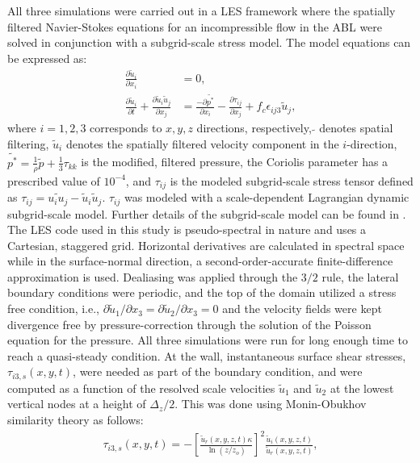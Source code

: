 All three simulations were carried out in a LES framework where the spatially filtered Navier-Stokes equations for an incompressible flow in the ABL were solved in conjunction with a subgrid-scale stress model. The model equations can be expressed as: 
\begin{align}
    \frac{\partial \tilde{u}_i}{\partial x_{i}} &= 0, \\
    \frac{\partial \tilde{u}_i}{\partial t}+ \frac{\partial \tilde{u}_i\tilde{u}_j}{\partial x_{j}}  &= \frac{-\partial \tilde{p^*}}{\partial x_i}-\frac{\partial \tau_{ij}}{\partial x_j}+ f_{c}\epsilon_{ij3}\tilde{u}_{j},   
\label{eqn:les_eqn}    
\end{align}
\noindent where $i={1,2,3}$ corresponds to $x,y,z$ directions, respectively, ${\tilde{}}$ denotes spatial filtering, $\tilde{u}_i$ denotes the spatially filtered velocity component in the $i$-direction, $\tilde{p^*}=\frac{1}{\rho} \tilde{p}+\frac{1}{3}\tau_{kk}$ is the modified, filtered pressure, the Coriolis parameter has a prescribed value of $10^{-4}$, and $\tau_{ij}$ is the modeled subgrid-scale stress tensor defined as $\tau_{ij}=\widetilde{u_i u_j}-\tilde{u}_i\tilde{u}_j$. $\tau_{ij}$ was modeled with a scale-dependent Lagrangian dynamic subgrid-scale model. Further details of the subgrid-scale model can be found in \citet{stoll_wrr_2006}. The LES code used in this study is pseudo-spectral in nature and uses a Cartesian, staggered grid. Horizontal derivatives are calculated in spectral space while in the surface-normal direction, a second-order-accurate finite-difference approximation is used. Dealiasing was applied through the $3/2$ rule, the lateral boundary conditions were periodic, and the top of the domain utilized a stress free condition, i.e., $\partial\tilde{u}_1/\partial x_3 = \partial \tilde{u}_2/\partial x_3=0$ and the velocity fields were kept divergence free by pressure-correction through the solution of the Poisson equation for the pressure.  All three simulations were run for long enough time to reach a quasi-steady condition. At the wall, instantaneous surface shear stresses, $\tau_{i3,s}(x,y,t)$, were needed as part of the boundary condition, and were computed as a function of the resolved scale velocities $\tilde{u}_1$ and $\tilde{u}_2$ at the lowest vertical nodes at a height of $\Delta_z/2$. This was done using Monin-Obukhov similarity theory as follows:
\begin{align}
\tau_{i3,s}(x,y,t) = -\left [ \frac{\tilde{u}_r(x,y,z,t)\kappa}{\ln(z/z_o)} \right ]^2\frac{\tilde{u}_i(x,y,z,t)}{\tilde{u}_r(x,y,z,t)}, 
\end{align}

